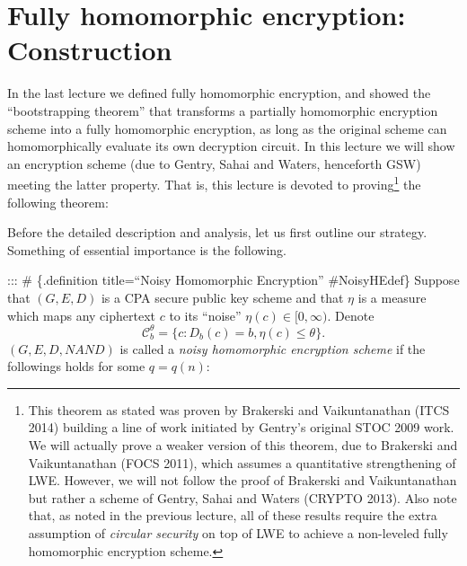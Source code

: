 \chapter{Fully homomorphic encryption: Construction}\label{chapfhetwo}

In the last lecture we defined fully homomorphic encryption, and showed
the ``bootstrapping theorem'' that transforms a partially homomorphic
encryption scheme into a fully homomorphic encryption, as long as the
original scheme can homomorphically evaluate its own decryption circuit.
In this lecture we will show an encryption scheme (due to Gentry, Sahai
and Waters, henceforth GSW) meeting the latter property. That is, this
lecture is devoted to proving\footnote{This theorem as stated was proven
  by Brakerski and Vaikuntanathan (ITCS 2014) building a line of work
  initiated by Gentry's original STOC 2009 work. We will actually prove
  a weaker version of this theorem, due to Brakerski and Vaikuntanathan
  (FOCS 2011), which assumes a quantitative strengthening of LWE.
  However, we will not follow the proof of Brakerski and Vaikuntanathan
  but rather a scheme of Gentry, Sahai and Waters (CRYPTO 2013). Also
  note that, as noted in the previous lecture, all of these results
  require the extra assumption of \emph{circular security} on top of LWE
  to achieve a non-leveled fully homomorphic encryption scheme.} the
following theorem:

\hypertarget{LWEFHEthm}{}

Before the detailed description and analysis, let us first outline our
strategy. Something of essential importance is the following.

::: \# \{.definition title=``Noisy Homomorphic Encryption''
\#NoisyHEdef\} Suppose that \((G,E,D)\) is a CPA secure public key
scheme and that \(\eta\) is a measure which maps any ciphertext \(c\) to
its ``noise'' \(\eta(c)\in [0, \infty).\) Denote
\[\mathcal{C}_b^\theta=\{c:D_b(c)=b,\eta(c)\leq\theta \}.\]
\((G,E,D,\ensuremath{\mathit{NAND}})\) is called a \emph{noisy
homomorphic encryption scheme} if the followings holds for some
\(q=q(n)\):

